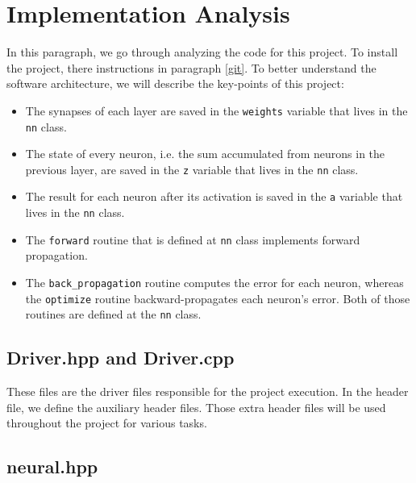 \section{Implementation Analysis}

In this paragraph, we go through analyzing the code for this project. To install the project, there instructions in paragraph \ref{git}. To better understand the software architecture, we will describe the key-points of this project:
\begin{itemize}
\item The synapses of each layer are saved in the \verb|weights| variable that lives in the \verb|nn| class.
\item The state of every neuron, i.e. the sum accumulated from neurons in the previous layer, are saved in the \verb|z| variable that lives in the \verb|nn| class.
\item The result for each neuron after its activation is saved in the \verb|a| variable that lives in the \verb|nn| class.
\item The \verb|forward| routine that is defined at \verb|nn| class implements forward propagation.
\item The \verb|back_propagation| routine computes the error for each neuron, whereas the \verb|optimize| routine backward-propagates each neuron's error. Both of those routines are defined at the \verb|nn| class.
\end{itemize}

\subsection{Driver.hpp and Driver.cpp}

These files are the driver files responsible for the project execution. In the header file, we define the auxiliary header files. Those extra header files will be used throughout the project for various tasks.

\subsection{neural.hpp}

